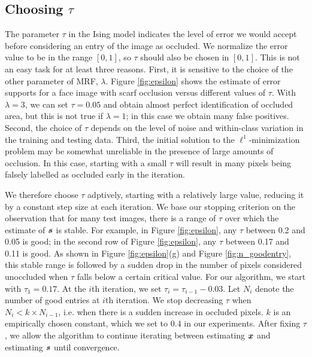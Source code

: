 \vspace{0mm}
\subsection{Choosing $\tau$} \label{sec:tau}

The parameter $\tau$ in the Ising model indicates the level
of error we would accept before considering an entry of the image as occluded. We
normalize the error value to be in the range $[0,1]$, so $\tau$
should also be chosen in $[0,1]$. This is not an easy
task for at least three reasons. First, it is sensitive to the
choice of the other parameter of MRF, $\lambda$. Figure
\ref{fig:epsilon} shows the estimate of error supports for a face
image with scarf occlusion versus different values of $\tau$.
With $\lambda = 3$, we can set $\tau=0.05$ and obtain almost perfect
identification of occluded area, but this is not true if $\lambda =
1$; in this case we obtain many false positives. Second, the choice of
$\tau$ depends on the level of noise and within-class variation in the
training and testing data. Third, the initial solution to
the $\ell^1$-minimization problem may be somewhat unreliable in the
presence of large amounts of occlusion.
In this case, starting with a small $\tau$ will result in many pixels being
falsely labelled as occluded early in the iteration.

We therefore choose $\tau$ adptively, starting with a
relatively large value, reducing it by a constant step size
at each iteration. We base our stopping criterion on the observation that for many test images, there is a
range of $\tau$ over which the estimate of $\boldsymbol{s}$ is stable.
For example, in Figure \ref{fig:epsilon}, any $\tau$ between 0.2 and 0.05 is good; in
the second row of Figure \ref{fig:epsilon}, any $\tau$ between
0.17 and 0.11 is good. As shown in Figure \ref{fig:epsilon}(g) and
Figure \ref{fig:n_goodentry}, this stable range is followed by a sudden drop in the
number of pixels considered unoccluded when $\tau$ falls below a certain critical value.
For our algorithm, we start with $\tau_1 = 0.17$. At the $i$th
iteration, we set $\tau_i = \tau_{i-1}-0.03$. Let $N_i$
denote the number of good entries at $i$th iteration. We stop
decreasing $\tau$ when $N_i < k \times N_{i-1}$, i.e. when there is a sudden increase in occluded pixels.  $k$ is an
empirically chosen constant, which we set to $0.4$ in our experiments.
After fixing $\tau$, we allow the algorithm to continue iterating
between estimating ${\boldsymbol{x}}$ and estimating $\boldsymbol{s}$ until convergence.


